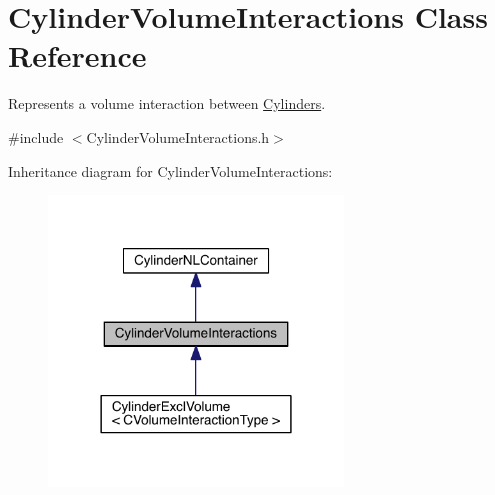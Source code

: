 \hypertarget{classCylinderVolumeInteractions}{\section{Cylinder\+Volume\+Interactions Class Reference}
\label{classCylinderVolumeInteractions}
}


Represents a volume interaction between \hyperlink{classCylinder}{Cylinders}.  




{\ttfamily \#include $<$Cylinder\+Volume\+Interactions.\+h$>$}



Inheritance diagram for Cylinder\+Volume\+Interactions\+:\nopagebreak
\begin{figure}[H]
\begin{center}
\leavevmode
\includegraphics[width=222pt]{classCylinderVolumeInteractions__inherit__graph}
\end{center}
\end{figure}


